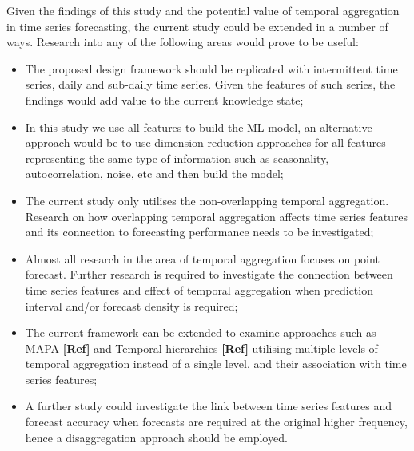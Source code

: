 \documentclass[]{elsarticle} %
\begin{document}
Given the findings of this study and the potential value of temporal
aggregation in time series forecasting, the current study could be
extended in a number of ways. Research into any of the following areas
would prove to be useful:

\begin{itemize}
\item
  The proposed design framework should be replicated with intermittent
  time series, daily and sub-daily time series. Given the features of
  such series, the findings would add value to the current knowledge
  state;
\item
  In this study we use all features to build the ML model, an
  alternative approach would be to use dimension reduction approaches
  for all features representing the same type of information such as
  seasonality, autocorrelation, noise, etc and then build the model;
\item
  The current study only utilises the non-overlapping temporal
  aggregation. Research on how overlapping temporal aggregation affects
  time series features and its connection to forecasting performance
  needs to be investigated;
\item
  Almost all research in the area of temporal aggregation focuses on
  point forecast. Further research is required to investigate the
  connection between time series features and effect of temporal
  aggregation when prediction interval and/or forecast density is
  required;
\item
  The current framework can be extended to examine approaches such as
  MAPA \textbf{{[}Ref{]}} and Temporal hierarchies \textbf{{[}Ref{]}}
  utilising multiple levels of temporal aggregation instead of a single
  level, and their association with time series features;
\item
  A further study could investigate the link between time series
  features and forecast accuracy when forecasts are required at the
  original higher frequency, hence a disaggregation approach should be
  employed.
\end{itemize}

\renewcommand\refname{References}

\end{document}
